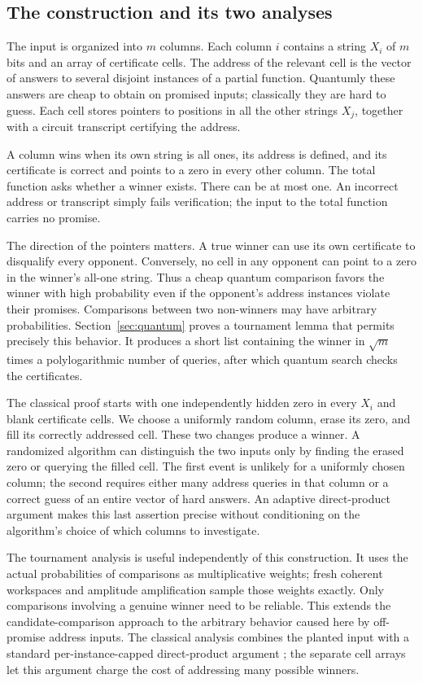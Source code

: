 \subsection{The construction and its two analyses}

The input is organized into $m$ columns. Each column $i$ contains a string
$X_i$ of $m$ bits and an array of certificate cells. The address of the
relevant cell is the vector of answers to several disjoint instances
of a partial function. Quantumly these answers are cheap to obtain on
promised inputs; classically they are hard to guess. Each cell stores
pointers to positions in all the other strings $X_j$, together with a
circuit transcript certifying the address.

A column wins when its own string is all ones, its address is defined,
and its certificate is correct and points to a zero in every other
column. The total function asks whether a winner exists. There can be
at most one. An incorrect address or transcript simply fails verification;
the input to the total function carries no promise.

The direction of the pointers matters. A true winner can use its own
certificate to disqualify every opponent. Conversely, no cell in any
opponent can point to a zero in the winner's all-one string. Thus a cheap
quantum comparison favors the winner with high probability even if the
opponent's address instances violate their promises. Comparisons between
two non-winners may have arbitrary probabilities. Section~\ref{sec:quantum}
proves a tournament lemma that permits precisely this behavior. It
produces a short list containing the winner in $\sqrt m$ times a
polylogarithmic number of queries, after which quantum search checks the
certificates.

The classical proof starts with one independently hidden zero in every
$X_i$ and blank certificate cells. We choose a uniformly random column,
erase its zero, and fill its correctly addressed cell. These two changes
produce a winner. A randomized algorithm can distinguish the two inputs
only by finding the erased zero or querying the filled cell. The first
event is unlikely for a uniformly chosen column; the second requires
either many address queries in that column or a correct guess of an
entire vector of hard answers. An adaptive direct-product argument makes
this last assertion precise without conditioning on the algorithm's
choice of which columns to investigate.

The tournament analysis is useful independently of this construction.
It uses the actual probabilities of comparisons as multiplicative
weights; fresh coherent workspaces and amplitude amplification sample
those weights exactly. Only comparisons involving a genuine winner
need to be reliable. This extends the candidate-comparison approach
to the arbitrary behavior caused here by off-promise address inputs.
The classical analysis combines the planted input with a standard
per-instance-capped direct-product argument
\cite{Shaltiel03,Drucker12}; the separate cell arrays let this argument
charge the cost of addressing many possible winners.

